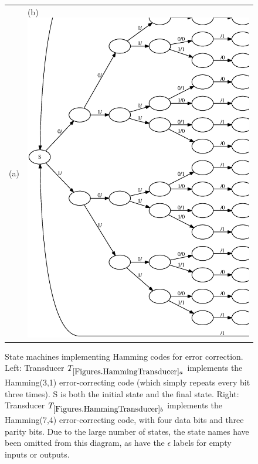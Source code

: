 \documentclass[english]{article}
\begin{document}
\newpage
\begin{figure}[h!t]
\begin{tabular}{ll}
(a) {hamming31}{width=.45\textwidth}
&
(b) \includegraphics[width=.45\textwidth]{hamming74.ps}
\end{tabular}
\caption{ 
State machines implementing Hamming codes for error correction.
Left:
Transducer $\hammingthreeone$ implements the Hamming(3,1) error-correcting code
(which simply repeats every bit three times).
S is both the initial state and the final state.
Right:
Transducer $\hammingsevenfour$ implements the Hamming(7,4) error-correcting code,
with four data bits and three parity bits.
Due to the large number of states, the state names have been omitted from this diagram,
as have the $\epsilon$ labels for empty inputs or outputs.
}
\end{figure}

\newpage
{}
\end{document}

